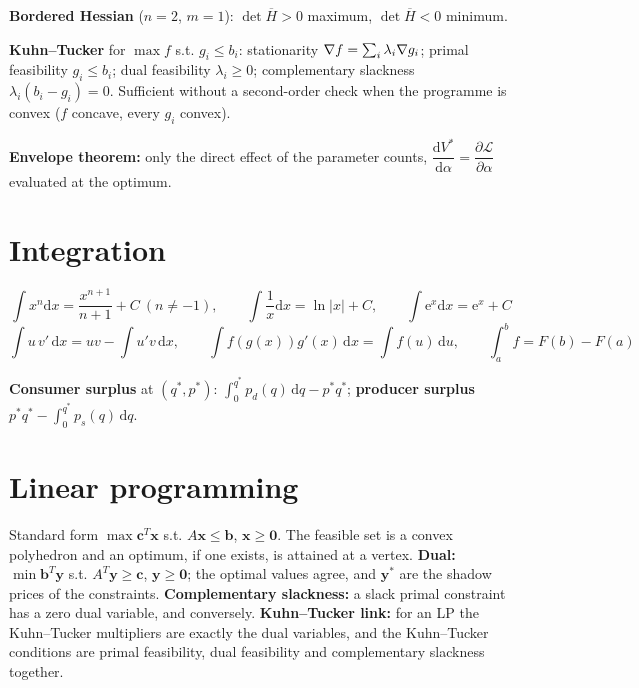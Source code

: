 \textbf{Bordered Hessian} ($n=2$, $m=1$): $\det\overline{H}>0$ maximum,
$\det\overline{H}<0$ minimum.

\textbf{Kuhn--Tucker} for $\max f$ s.t. $g_{i}\le b_{i}$: stationarity
$\nabla f=\sum_{i}\lambda_{i}\nabla g_{i}$; primal feasibility
$g_{i}\le b_{i}$; dual feasibility $\lambda_{i}\ge0$; complementary
slackness $\lambda_{i}(b_{i}-g_{i})=0$. Sufficient without a second-order
check when the programme is convex ($f$ concave, every $g_{i}$ convex).

\textbf{Envelope theorem:} only the direct effect of the parameter counts,
$\dfrac{\mathrm{d}V^{*}}{\mathrm{d}\alpha}
=\dfrac{\partial\mathcal{L}}{\partial\alpha}$ evaluated at the optimum.

\section*{Integration}

\[
  \int x^{n}\mathrm{d}x=\frac{x^{n+1}}{n+1}+C\ (n\neq-1),\qquad
  \int\frac{1}{x}\mathrm{d}x=\ln|x|+C,\qquad
  \int\mathrm{e}^{x}\mathrm{d}x=\mathrm{e}^{x}+C
\]
\[
  \int u\,v'\,\mathrm{d}x=uv-\int u'v\,\mathrm{d}x,\qquad
  \int f(g(x))g'(x)\,\mathrm{d}x=\int f(u)\,\mathrm{d}u,\qquad
  \int_{a}^{b}f=F(b)-F(a)
\]

\textbf{Consumer surplus} at $(q^{*},p^{*})$:
$\int_{0}^{q^{*}}p_{d}(q)\,\mathrm{d}q-p^{*}q^{*}$;
\textbf{producer surplus} $p^{*}q^{*}-\int_{0}^{q^{*}}p_{s}(q)\,
\mathrm{d}q$.

\section*{Linear programming}

Standard form $\max \mathbf{c}^{T}\mathbf{x}$ s.t.
$A\mathbf{x}\le\mathbf{b}$, $\mathbf{x}\ge\mathbf{0}$. The feasible set is
a convex polyhedron and an optimum, if one exists, is attained at a
vertex. \textbf{Dual:} $\min\mathbf{b}^{T}\mathbf{y}$ s.t.
$A^{T}\mathbf{y}\ge\mathbf{c}$, $\mathbf{y}\ge\mathbf{0}$; the optimal
values agree, and $\mathbf{y}^{*}$ are the shadow prices of the
constraints. \textbf{Complementary slackness:} a slack primal constraint
has a zero dual variable, and conversely. \textbf{Kuhn--Tucker link:} for an
LP the Kuhn--Tucker multipliers are exactly the dual variables, and the
Kuhn--Tucker conditions are primal feasibility, dual feasibility and
complementary slackness together.
